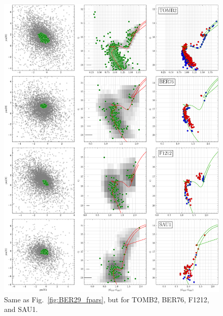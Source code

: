 \documentclass{aa}
\begin{document}
\begin{appendix}
 \begin{figure}
  \centering
  \includegraphics[height=.95\textheight]{figs/4_fpars.png}
  \caption{Same as Fig.~\ref{fig:BER29_fpars}, but  for TOMB2, BER76, F1212, and SAU1.}
  \label{fig:4fpars}
 \end{figure}


\end{appendix}
\end{document}
